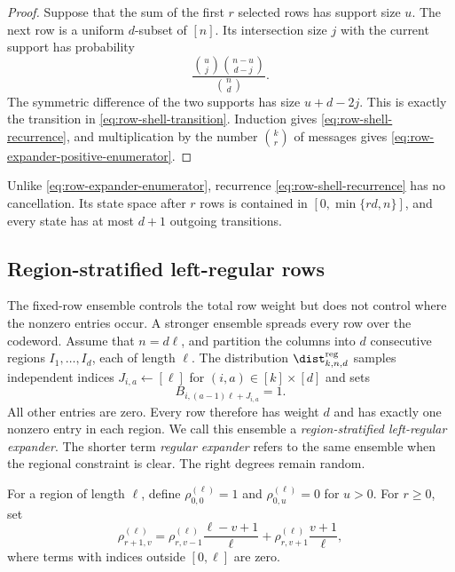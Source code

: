\begin{proof}
Suppose that the sum of the first $r$ selected rows has support size $u$.
The next row is a uniform $d$-subset of $[n]$.  Its intersection size $j$
with the current support has probability
\[
 \frac{\binom{u}{j}\binom{n-u}{d-j}}{\binom{n}{d}}.
\]
The symmetric difference of the two supports has size $u+d-2j$.  This is
exactly the transition in \eqref{eq:row-shell-transition}.  Induction gives
\eqref{eq:row-shell-recurrence}, and multiplication by the number
$\binom{k}{r}$ of messages gives
\eqref{eq:row-expander-positive-enumerator}.
\end{proof}

Unlike \eqref{eq:row-expander-enumerator}, recurrence
\eqref{eq:row-shell-recurrence} has no cancellation.  Its state space after
$r$ rows is contained in $[0,\min\{rd,n\}]$, and every state has at most
$d+1$ outgoing transitions.

\subsection{Region-stratified left-regular rows}
\label{sec:region-left-regular-expander}

The fixed-row ensemble controls the total row weight but does not control
where the nonzero entries occur.  A stronger ensemble spreads every row over
the codeword.  Assume that $n=d\ell$, and partition the columns into $d$
consecutive regions $I_1,\ldots,I_d$, each of length $\ell$.  The distribution
$\dist^{\mathrm{reg}}_{k,n,d}$ samples independent indices
$J_{i,a}\gets[\ell]$ for $(i,a)\in[k]\times[d]$ and sets
\begin{equation}
 B_{i,(a-1)\ell+J_{i,a}}=1.
 \label{eq:region-left-regular-definition}
\end{equation}
All other entries are zero.  Every row therefore has weight $d$ and has
exactly one nonzero entry in each region.  We call this ensemble a
\emph{region-stratified left-regular expander}.  The shorter term
\emph{regular expander} refers to the same ensemble when the regional
constraint is clear.  The right degrees remain random.

For a region of length $\ell$, define $\rho^{(\ell)}_{0,0}=1$ and
$\rho^{(\ell)}_{0,u}=0$ for $u>0$.  For $r\geq0$, set
\begin{equation}
 \rho^{(\ell)}_{r+1,v}
 =\rho^{(\ell)}_{r,v-1}\frac{\ell-v+1}{\ell}
  +\rho^{(\ell)}_{r,v+1}\frac{v+1}{\ell},
 \label{eq:region-left-regular-shell-recurrence}
\end{equation}
where terms with indices outside $[0,\ell]$ are zero.

